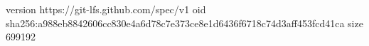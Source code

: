 version https://git-lfs.github.com/spec/v1
oid sha256:a988eb8842606cc830e4a6d78c7e373ce8e1d6436f6718c74d3aff453fcd41ca
size 699192
